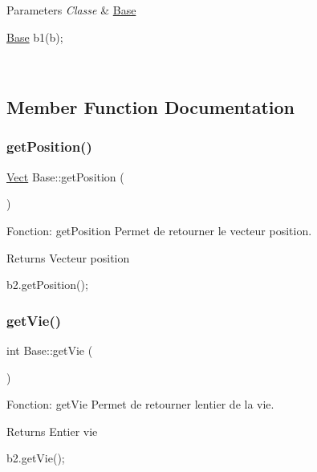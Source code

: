\begin{DoxyParams}{Parameters}
{\em Classe} & \hyperlink{classBase}{Base} 
\begin{DoxyCode}
\hyperlink{classBase}{Base} b1(b);
\end{DoxyCode}
 \\
\hline
\end{DoxyParams}


\subsection{Member Function Documentation}
\mbox{\label{classBase_a16d0ed1836dfedfb51d54308d22b4a38}} 
\subsubsection{\texorpdfstring{get\+Position()}{getPosition()}}
{\footnotesize\ttfamily \hyperlink{classVect}{Vect} Base\+::get\+Position (\begin{DoxyParamCaption}{ }\end{DoxyParamCaption})}



Fonction\+: get\+Position Permet de retourner le vecteur position. 

\begin{DoxyReturn}{Returns}
Vecteur position 
\begin{DoxyCode}
b2.getPosition();
\end{DoxyCode}
 
\end{DoxyReturn}
\mbox{\label{classBase_a922b45a3578821dd6ab666206b1a637e}} 
\subsubsection{\texorpdfstring{get\+Vie()}{getVie()}}
{\footnotesize\ttfamily int Base\+::get\+Vie (\begin{DoxyParamCaption}{ }\end{DoxyParamCaption})}



Fonction\+: get\+Vie Permet de retourner l\textquotesingle{}entier de la vie. 

\begin{DoxyReturn}{Returns}
Entier vie 
\begin{DoxyCode}
b2.getVie();
\end{DoxyCode}
 
\end{DoxyReturn}
\mbox{\label{classBase_a0471688678ab6e2aba5ee69d290c2e20}} 
